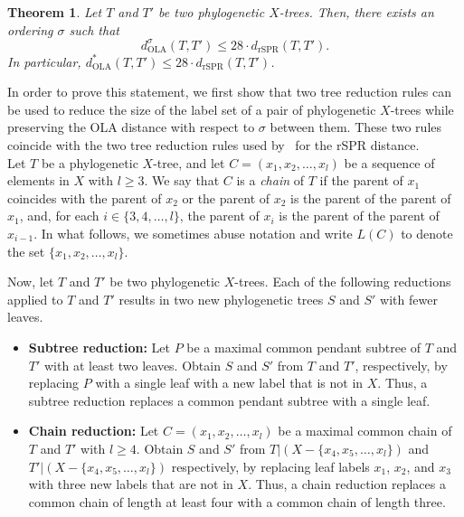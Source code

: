 \documentclass{article}
\newtheorem{theorem}{Theorem}
\newcommand{\rSPR}{\mathrm{rSPR}}
\newcommand{\OLA}{\mathrm{OLA}}
\begin{document}
\begin{theorem} \label{thm:OLA-20SPR}
    Let $T$ and $T'$ be two phylogenetic $X$-trees.  Then, there exists an ordering $\sigma$ such that 
    \[
    d^{\sigma}_\OLA(T,T') \leq 28\cdot d_\rSPR(T,T').
    \]
    In particular, $d^\ast_\OLA(T,T')  \leq 28\cdot d_\rSPR(T,T')$.
\end{theorem}

In order to prove this statement, we first show that two tree reduction rules can be used to reduce the size of the label set of a pair of phylogenetic $X$-trees while preserving the OLA distance with respect to $\sigma$ between them. These two rules coincide with the two tree reduction rules used by~\cite{bordewichSemple2005} for the rSPR distance. \\

Let $T$ be a phylogenetic $X$-tree, and let $C=(x_1,x_2,\ldots,x_l)$ be a sequence of elements in $X$ with $l\geq 3$.  We say that $C$ is a {\em chain} of $T$ if the parent of $x_1$ coincides with the parent of $x_2$ or the parent of $x_2$ is the parent of the parent of $x_1$, and, for each $i\in\{3,4,\ldots,l\}$, the parent of $x_i$ is the parent of the parent of $x_{i-1}$. In what follows, we sometimes abuse notation and write $L(C)$ to denote the set $\{x_1,x_2,\ldots,x_l\}$.

Now, let $T$ and $T'$ be two phylogenetic $X$-trees. Each of the following reductions applied to $T$ and $T'$ results in two new phylogenetic trees $S$ and $S'$ with fewer leaves.

\begin{itemize}
    \item {\bf Subtree reduction:} Let $P$ be a maximal common pendant subtree of $T$ and $T'$ with at least two leaves. Obtain $S$ and $S'$  from $T$ and $T'$, respectively, by replacing $P$ with a single leaf with a new label that is not in $X$. Thus, a subtree reduction replaces a common pendant subtree with a single leaf.
    \item {\bf Chain reduction:} Let $C=(x_1,x_2,\ldots,x_l)$ be a maximal common chain of $T$ and $T'$ with $l\geq 4$. Obtain $S$ and $S'$ from $T|(X-\{x_4,x_5,\ldots,x_l\})$ and $T'|(X-\{x_4,x_5,\ldots,x_l\})$ respectively, by replacing leaf labels $x_1$, $x_2$, and $x_3$ with three new labels that are not in $X$. Thus, a chain reduction replaces a common chain of length at least four with a common chain of length three.
\end{itemize}
\end{document}
